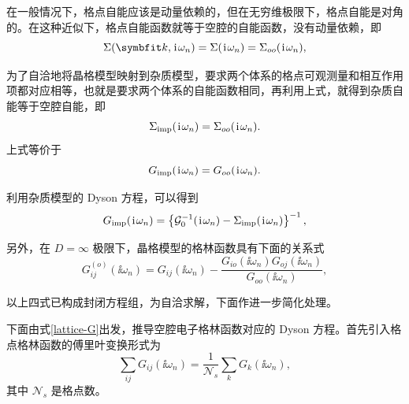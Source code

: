 在一般情况下，格点自能应该是动量依赖的，但在无穷维极限下，格点自能是对角的。在这种近似下，格点自能函数就等于空腔的自能函数，没有动量依赖\cite{Hartmann1989}，即 
\begin{equation}
    \Sigma(\vct{k},\ii\omega_n)=\Sigma(\ii\omega_n)=\Sigma_{oo}(\ii\omega_n),
\end{equation}

为了自洽地将晶格模型映射到杂质模型，要求两个体系的格点可观测量和相互作用项都对应相等，也就是要求两个体系的自能函数相同，再利用上式，就得到杂质自能等于空腔自能，即 
\begin{equation}
    \Sigma_{\mathrm{imp}}(\hspace{0.1em}\mathrm{i}\hspace{0.1em}\omega_n)=\Sigma_{oo}(\hspace{0.1em}\mathrm{i}\hspace{0.1em}\omega_n).\label{dmftscf1}
\end{equation}
上式等价于
\begin{equation}
    G_{\mathrm{imp}}(\hspace{0.1em}\mathrm{i}\hspace{0.1em}\omega_n)=G_{oo}(\hspace{0.1em}\mathrm{i}\hspace{0.1em}\omega_n).\label{dmftscf2}
\end{equation}

利用杂质模型的 Dyson 方程，可以得到 
\begin{equation}
    G_{\mathrm{imp}}(\hspace{0.1em}\mathrm{i}\hspace{0.1em}\omega_n)=\left\{ \mathcal{G}_0^{-1}(\hspace{0.1em}\mathrm{i}\hspace{0.1em}\omega_n)-\Sigma_{\mathrm{imp}}(\hspace{0.1em}\mathrm{i}\hspace{0.1em}\omega_n) \right\}^{-1},\label{dmftscf3}
\end{equation}

另外，在 $D=\infty$ 极限下，晶格模型的格林函数具有下面的关系式\cite{PhysRevB.77.235106} 
\begin{equation}
    G_{ij}^{(o)}(\ii\omega_n)=G_{ij}(\ii\omega_n)-\frac{G_{io}(\ii\omega_n)G_{oj}(\ii\omega_n)}{G_{oo}(\ii\omega_n)},\label{lattice-G}
\end{equation}

以上四式已构成封闭方程组，为自洽求解，下面作进一步简化处理。

下面由式\eqref{lattice-G}出发，推导空腔电子格林函数对应的 Dyson 方程。首先引入格点格林函数的傅里叶变换形式为
\begin{equation}
    \sum_{ij}G_{ij}(\ii\omega_n)=\frac{1}{\mathcal{N}_s}\sum_{k}G_{k}(\ii\omega_n),
\end{equation}
其中 $\mathcal{N}_s$ 是格点数。


